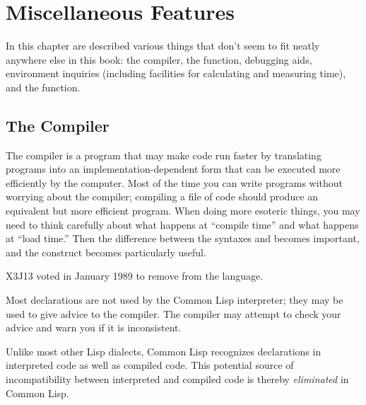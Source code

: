 
\clearpage\def\pagestatus{FINAL PROOF}

\chapter{Miscellaneous Features}

In this chapter are described various things that don't
seem to fit neatly anywhere else in this book:
the compiler, the 
function, debugging aids, environment inquiries (including facilities
for calculating and measuring time), and the  function.



\section{The Compiler}
\label{COMPILER-SECTION}

\begin{obsolete}\noindent
The compiler is a program that may make code run faster by translating
programs into an implementation-dependent form that can
be executed more efficiently by the computer.  Most of the time
you can write programs without worrying about the compiler;
compiling a file of code should produce an equivalent but more
efficient program.  When doing more esoteric things, you may need to
think carefully about what happens at ``compile time'' and what happens
at ``load time.''  Then the difference between the syntaxes 
and \cd{\#,} becomes important, and the  construct
becomes particularly useful.
\end{obsolete}

\begin{newer}
X3J13 voted in January 1989
 to remove \cd{\#,} from the language.
\end{newer}

\everypar{}
Most declarations are not used by the Common Lisp interpreter;
they may be used to give advice to the compiler.  The compiler may attempt
to check your advice and warn you if it is inconsistent.

Unlike most other Lisp dialects, Common Lisp recognizes 
declarations in interpreted code as well as compiled code.
This potential source of incompatibility between interpreted and compiled
code is thereby \emph{eliminated} in Common Lisp.


